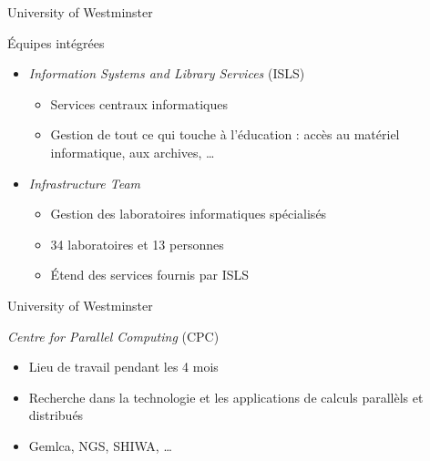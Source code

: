 \begin{frame}{University of Westminster}
	\begin{block}{\'Equipes int\'egr\'ees}
		\begin{itemize}
			\item \textit{Information Systems and Library Services} (ISLS)
			\begin{itemize}
				\item Services centraux informatiques
				\item Gestion de tout ce qui touche \`a l'\'education : acc\`es au mat\'eriel  informatique, aux archives, \ldots

			\end{itemize}

			\item \textit{Infrastructure Team}
			\begin{itemize}
				\item Gestion des laboratoires informatiques sp\'ecialis\'es
				\item 34 laboratoires et 13 personnes
				\item \'Etend des services fournis par ISLS

			\end{itemize}

		\end{itemize}

	\end{block}

\end{frame}


\begin{frame}{University of Westminster}
	\begin{block}{\textit{Centre for Parallel Computing}  (CPC)}
		\begin{itemize}
			\item Lieu de travail pendant les 4 mois
			\item Recherche dans la technologie et les applications de calculs parall\`els et distribu\'es
			\item Gemlca, NGS, SHIWA, \ldots

		\end{itemize}

	\end{block}

\end{frame}